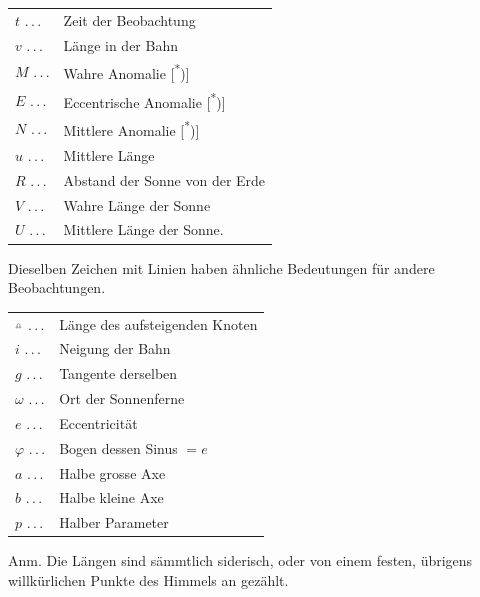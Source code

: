 \begin{minipage}[t]{.48\linewidth}
\small\setlength{\tabcolsep}{0pt}\renewcommand{\arraystretch}{1.2}
\begin{tabular}{@{}l@{\quad}p{.77\linewidth}@{}}
$t$ .\,.\,. & Zeit der Beobachtung\\
$v$ .\,.\,. & Länge in der Bahn\\
$M$ .\,.\,. & Wahre Anomalie [\textsuperscript{*})]\\
$E$ .\,.\,. & Eccentrische Anomalie [\textsuperscript{*})]\\
$N$ .\,.\,. & Mittlere Anomalie [\textsuperscript{*})]\\
$u$ .\,.\,. & Mittlere Länge\\
$R$ .\,.\,. & Abstand der Sonne von der Erde\\
$V$ .\,.\,. & Wahre Länge der Sonne\\
$U$ .\,.\,. & Mittlere Länge der Sonne.
\end{tabular}
\end{minipage}
\par\begingroup\renewcommand{\thefootnote}{}\endgroup
\clearpage
{}
Dieselben Zeichen mit Linien haben ähnliche Bedeutungen für andere Beobachtungen.

\medskip\noindent\begin{minipage}[c]{.54\linewidth}
\setlength{\tabcolsep}{0pt}\renewcommand{\arraystretch}{1.2}
\begin{tabular}{@{}l@{\quad}p{.78\linewidth}@{}}
$\AstNode$ .\,.\,. & Länge des aufsteigenden Knoten\\
$i$ .\,.\,. & Neigung der Bahn\\
$g$ .\,.\,. & Tangente derselben\\
$\omega$ .\,.\,. & Ort der Sonnenferne\\
$e$ .\,.\,. & Eccentricität\\
$\varphi$ .\,.\,. & Bogen dessen Sinus $=e$\\
$a$ .\,.\,. & Halbe grosse Axe\\
$b$ .\,.\,. & Halbe kleine Axe\\
$p$ .\,.\,. & Halber Parameter
\end{tabular}
\end{minipage}\hfill
\begin{minipage}[c]{.42\linewidth}
\setlength{\parindent}{1.2em}
Anm. Die Längen sind sämmtlich siderisch, oder von einem festen, übrigens willkürlichen Punkte des Himmels an gezählt.
\end{minipage}
\clearpage\endgroup
